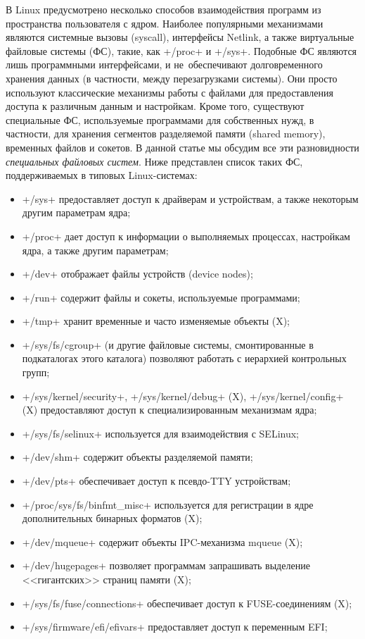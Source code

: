 \documentclass[10pt,oneside,a4paper]{article}
\begin{document}
В Linux предусмотрено несколько способов взаимодействия программ из пространства
пользователя с ядром. Наиболее популярными механизмами являются системные вызовы
(syscall), интерфейсы Netlink, а также виртуальные файловые системы (ФС), такие,
как +/proc+ и +/sys+. Подобные ФС являются лишь программными интерфейсами, и
не~обеспечивают долговременного хранения данных (в частности, между
перезагрузками системы). Они просто используют классические механизмы работы с
файлами для предоставления доступа к различным данным и настройкам.  Кроме того,
существуют специальные ФС, используемые программами для собственных нужд, в
частности, для хранения сегментов разделяемой памяти (shared memory), временных
файлов и сокетов. В данной статье мы обсудим все эти разновидности
\emph{специальных файловых систем}. Ниже представлен список таких ФС,
поддерживаемых в типовых Linux-системах:
\begin{itemize}
	\item +/sys+ предоставляет доступ к драйверам и устройствам, а также
		некоторым другим параметрам ядра;
	\item +/proc+ дает доступ к информации о выполняемых процессах,
		настройкам ядра, а также другим параметрам;
	\item +/dev+ отображает файлы устройств (device nodes);
	\item +/run+ содержит файлы и сокеты, используемые программами;
	\item +/tmp+ хранит временные и часто изменяемые объекты (X);
	\item +/sys/fs/cgroup+ (и другие файловые системы, смонтированные в
		подкаталогах этого каталога) позволяют работать с иерархией
		контрольных групп;
	\item +/sys/kernel/security+, +/sys/kernel/debug+ (X),
		+/sys/kernel/config+ (X) предоставляют доступ к
		специализированным механизмам ядра;
	\item +/sys/fs/selinux+ используется для взаимодействия с SELinux;
	\item +/dev/shm+ содержит объекты разделяемой памяти;
	\item +/dev/pts+ обеспечивает доступ к псевдо-TTY устройствам;
	\item +/proc/sys/fs/binfmt_misc+ используется для регистрации в ядре
		дополнительных бинарных форматов (X);
	\item +/dev/mqueue+ содержит объекты IPC-механизма mqueue (X);
	\item +/dev/hugepages+ позволяет программам запрашивать выделение 
		<<гигантских>> страниц памяти (X);
	\item +/sys/fs/fuse/connections+ обеспечивает доступ к
		FUSE-соединениям (X);
	\item +/sys/firmware/efi/efivars+ предоставляет доступ к переменным EFI;
\end{itemize}
\end{document}
